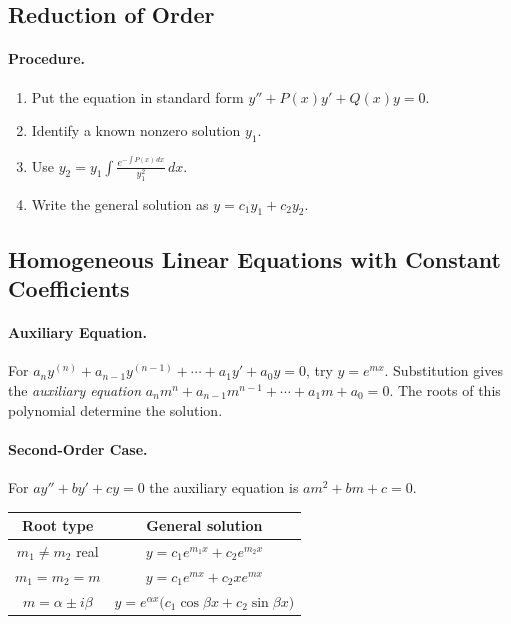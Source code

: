 \documentclass[oneside]{book}
\begin{document}

\subsection{Reduction of Order}


\paragraph{Procedure.}
\begin{enumerate}
    \item Put the equation in standard form $y''+P(x)y'+Q(x)y=0$.
    \item Identify a known nonzero solution $y_1$.
    \item Use $y_2=y_1\int \frac{e^{-\int P(x)\,dx}}{y_1^2}\,dx$. 
    \item Write the general solution as $y=c_1y_1+c_2y_2$.
\end{enumerate}


\subsection{Homogeneous Linear Equations with Constant Coefficients}

\paragraph{Auxiliary Equation.}
For $a_ny^{(n)}+a_{n-1}y^{(n-1)}+\cdots+a_1y'+a_0y=0$, try $y=e^{mx}$. Substitution gives the \emph{auxiliary equation} $a_nm^n+a_{n-1}m^{n-1}+\cdots+a_1m+a_0=0$. The roots of this polynomial determine the solution.

\paragraph{Second-Order Case.}
For $ay''+by'+cy=0$ the auxiliary equation is $am^2+bm+c=0$.

\begin{center}
\begin{tabular}{c|c}
Root type & General solution\\
\hline
$m_1\neq m_2$ real & $y=c_1e^{m_1x}+c_2e^{m_2x}$\\[0.3em]
$m_1=m_2=m$ & $y=c_1e^{mx}+c_2xe^{mx}$\\[0.3em]
$m=\alpha\pm i\beta$ & $y=e^{\alpha x}\bigl(c_1\cos \beta x+c_2\sin \beta x\bigr)$
\end{tabular}
\end{center}
\end{document}
